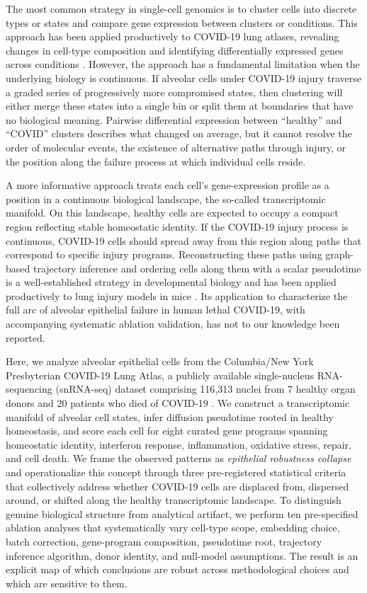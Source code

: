 \documentclass[11pt]{article}
\begin{document}
The most common strategy in single-cell genomics is to cluster cells into discrete types or states and compare gene expression between clusters or conditions. This approach has been applied productively to COVID-19 lung atlases, revealing changes in cell-type composition and identifying differentially expressed genes across conditions \citep{Melms2021, Delorey2021, Bharat2020}. However, the approach has a fundamental limitation when the underlying biology is continuous. If alveolar cells under COVID-19 injury traverse a graded series of progressively more compromised states, then clustering will either merge these states into a single bin or split them at boundaries that have no biological meaning. Pairwise differential expression between ``healthy'' and ``COVID'' clusters describes what changed on average, but it cannot resolve the order of molecular events, the existence of alternative paths through injury, or the position along the failure process at which individual cells reside.

A more informative approach treats each cell's gene-expression profile as a position in a continuous biological landscape, the so-called transcriptomic manifold. On this landscape, healthy cells are expected to occupy a compact region reflecting stable homeostatic identity. If the COVID-19 injury process is continuous, COVID-19 cells should spread away from this region along paths that correspond to specific injury programs. Reconstructing these paths using graph-based trajectory inference and ordering cells along them with a scalar pseudotime is a well-established strategy in developmental biology \citep{Haghverdi2016, Setty2019, Street2018} and has been applied productively to lung injury models in mice \citep{Strunz2020, Riemondy2019}. Its application to characterize the full arc of alveolar epithelial failure in human lethal COVID-19, with accompanying systematic ablation validation, has not to our knowledge been reported.

Here, we analyze alveolar epithelial cells from the Columbia/New York Presbyterian COVID-19 Lung Atlas, a publicly available single-nucleus RNA-sequencing (snRNA-seq) dataset comprising 116{,}313 nuclei from 7 healthy organ donors and 20 patients who died of COVID-19 \citep{Melms2021}. We construct a transcriptomic manifold of alveolar cell states, infer diffusion pseudotime rooted in healthy homeostasis, and score each cell for eight curated gene programs spanning homeostatic identity, interferon response, inflammation, oxidative stress, repair, and cell death. We frame the observed patterns as \emph{epithelial robustness collapse} and operationalize this concept through three pre-registered statistical criteria that collectively address whether COVID-19 cells are displaced from, dispersed around, or shifted along the healthy transcriptomic landscape. To distinguish genuine biological structure from analytical artifact, we perform ten pre-specified ablation analyses that systematically vary cell-type scope, embedding choice, batch correction, gene-program composition, pseudotime root, trajectory inference algorithm, donor identity, and null-model assumptions. The result is an explicit map of which conclusions are robust across methodological choices and which are sensitive to them.
\end{document}
